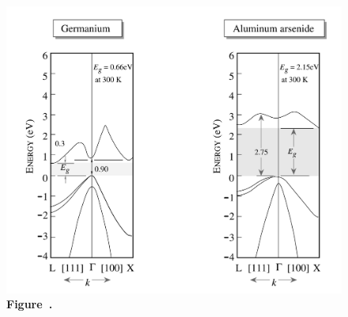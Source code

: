 \begin{figure}[h!]
\begin{minipage}{0.64\textwidth}
		\includegraphics[width=\textwidth]{img/Germanium&Aluminium.png}
		\\[0.5em]
		\textbf{Figure~\thefigure.}
		\label{fig:Germanium&Aluminium}
	\end{minipage}
\end{figure}

